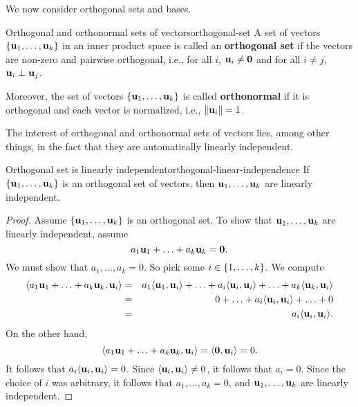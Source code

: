 We now consider orthogonal sets and bases.

\begin{definition}{Orthogonal and orthonormal sets of vectors}{orthogonal-set}
  A set of vectors $\set{\vect{u}_1,\ldots,\vect{u}_k}$ in an inner
  product space is called an \textbf{orthogonal set}%
   if the vectors are non-zero and pairwise
  orthogonal, i.e., for all $i$, $\vect{u}_i\neq\vect{0}$ and for all
  $i\neq j$, $\vect{u}_i\orth\vect{u}_j$.
  \smallskip\smallskip

  Moreover, the set of vectors $\set{\vect{u}_1,\ldots,\vect{u}_k}$ is
  called \textbf{orthonormal}%
   if it is orthogonal and each vector is
  normalized, i.e., $\norm{\vect{u}_i}=1$.
\end{definition}

The interest of orthogonal and orthonormal sets of vectors lies, among
other things, in the fact that they are automatically linearly
independent.

\begin{proposition}{Orthogonal set is linearly independent}{orthogonal-linear-independence}
  If $\set{\vect{u}_1,\ldots,\vect{u}_k}$ is an orthogonal set of
  vectors, then $\vect{u}_1,\ldots,\vect{u}_k$ are linearly
  independent.
\end{proposition}

\begin{proof}
  Assume $\set{\vect{u}_1,\ldots,\vect{u}_k}$ is an orthogonal set. To
  show that $\vect{u}_1,\ldots,\vect{u}_k$ are linearly
  independent, assume
  \begin{equation*}
    a_1\vect{u}_1 + \ldots + a_k\vect{u}_k = \vect{0}.
  \end{equation*}
  We must show that $a_1,\ldots,a_k = 0$. So pick some
  $i\in\left\{1,\ldots,k\right\}$. We compute
  \begin{eqnarray*}
    \iprod{a_1\vect{u}_1 + \ldots + a_k\vect{u}_k, \vect{u}_i}
    &=& a_1\iprod{\vect{u}_1,\vect{u}_i}
        + \ldots
        + a_i\iprod{\vect{u}_i,\vect{u}_i}
        + \ldots
        + a_k\iprod{\vect{u}_k,\vect{u}_i} \\
    &=& 0
        + \ldots
        + a_i\iprod{\vect{u}_i,\vect{u}_i}
        + \ldots
        + 0 \\
    &=& a_i \iprod{\vect{u}_i,\vect{u}_i}.
  \end{eqnarray*}
  On the other hand,
  \begin{equation*}
    \iprod{a_1\vect{u}_1 + \ldots + a_k\vect{u}_k, \vect{u}_i}
    = \iprod{\vect{0}, \vect{u}_i} = 0.
  \end{equation*}
  It follows that $a_i \iprod{\vect{u}_i,\vect{u}_i} = 0$. Since
  $\iprod{\vect{u}_i,\vect{u}_i}\neq 0$, it follows that
  $a_i=0$. Since the choice of $i$ was arbitrary, it follows that
  $a_1,\ldots,a_k = 0$, and $\vect{u}_1,\ldots,\vect{u}_k$ are
  linearly independent.
\end{proof}

